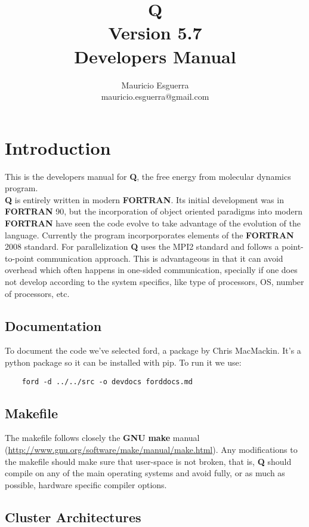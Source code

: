 \documentclass[10pt, oneside, pdftex]{article}
\title{Q\\
    \LARGE Version 5.7 \\
    \LARGE \vspace*{-10pt}Developers Manual\vspace*{10pt}}
\author{
  \vspace{10pt}
  Mauricio Esguerra \\
  \vspace{4pt}
  mauricio.esguerra@gmail.com \\
  \vspace{20pt}
  }
\makeatletter
\def\printtitle{
{\color{bl} \centering \Huge \textbf{\@title}\par}} %
\def\printauthor{                        %
{\centering \small \@author}}            %
\makeatother
\begin{document}
\printtitle
\printauthor
\tableofcontents
%

\vspace{20pt}
\section{Introduction}
This is  the developers manual  for \textbf{Q}, the free  energy from
molecular dynamics program.\\
\noindent \textbf{Q}  is entirely written in  modern \textbf{FORTRAN}.
Its  initial   development  was   in  \textbf{FORTRAN}  90,   but  the
incorporation    of   object    oriented    paradigms   into    modern
\textbf{FORTRAN} have  seen the code  evolve to take advantage  of the
evolution  of the  language.   Currently  the program  incorporporates
elements of  the \textbf{FORTRAN}  2008 standard.  For parallelization
\textbf{Q}  uses  the  MPI2  standard  and  follows  a  point-to-point
communication  approach. This  is advantageous  in that  it can  avoid
overhead which often happens  in one-sided communication, specially if
one does not  develop according to the system specifics,  like type of
processors, OS, number of processors, etc.


\subsection{Documentation}
\label{documentation}
To document the code we've selected ford, a package by Chris
MacMackin. It's a python package so it can be installed with pip.
To run it we use:
\begin{Verbatim}
    ford -d ../../src -o devdocs forddocs.md
\end{Verbatim}

\subsection{Makefile}
\label{makefile}
The  makefile follows  closely the  \textbf{GNU} \textbf{make}  manual
(\url{http://www.gnu.org/software/make/manual/make.html}).         Any
modifications to the makefile should  make sure that user-space is not
broken,  that  is,  \textbf{Q}  should  compile on  any  of  the  main
operating systems  and avoid fully,  or as much as  possible, hardware
specific compiler options.\\

\subsection{Cluster Architectures}
\label{clusterarchitectures}
\end{document}
